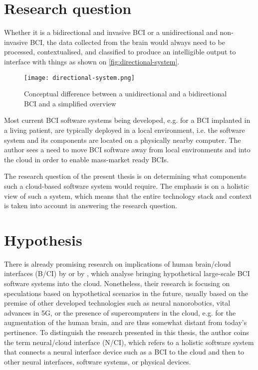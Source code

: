 \section{Research question}
\label{chapter1-research-question}

Whether it is a bidirectional and invasive BCI or a unidirectional and non-invasive BCI, the data collected from the brain would always need to be processed, contextualised, and classified to produce an intelligible output to interface with things as shown on \autoref{fig:directional-system}.

\begin{figure}[ht]
  \centering
  \texttt{[image: directional-system.png]}
  \caption{Conceptual difference between a unidirectional and a bidirectional BCI and a simplified overview}
  \label{fig:directional-system}
\end{figure}

Most current BCI software systems being developed, e.g. for a BCI implanted in a living patient, are typically deployed in a local environment, i.e. the software system and its components are located on a physically nearby computer. The author sees a need to move BCI software away from local environments and into the cloud in order to enable mass-market ready BCIs.

The research question of the present thesis is on determining what components such a cloud-based software system would require. The emphasis is on a holistic view of such a system, which means that the entire technology stack and context is taken into account in answering the research question.

\section{Hypothesis}
\label{chapter1-hypothesis}

There is already promising research on implications of human brain/cloud interfaces (B/CI) by \citeauthor{martins_human_2019} \citeyearpar{martins_human_2019} or by \citeauthor{angelica_cognitive_2021} \citeyearpar{angelica_cognitive_2021}, which analyse bringing hypothetical large-scale BCI software systems into the cloud. Nonetheless, their research is focusing on speculations based on hypothetical scenarios in the future, usually based on the premise of other developed technologies such as neural nanorobotics, vital advances in 5G, or the presence of supercomputers in the cloud, e.g. for the augmentation of the human brain, and are thus somewhat distant from today's pertinence. To distinguish the research presented in this thesis, the author coins the term neural/cloud interface (N/CI), which refers to a holistic software system that connects a neural interface device such as a BCI to the cloud and then to other neural interfaces, software systems, or physical devices.

